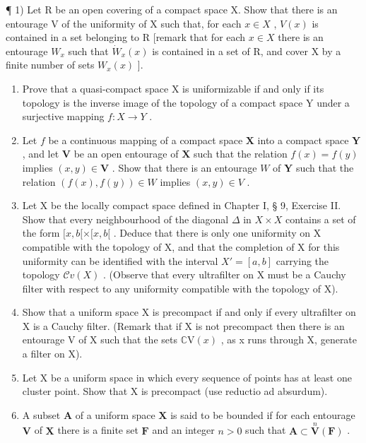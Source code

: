 \BourbakiExerciseGroup

¶ 1) Let R be an open covering of a compact space X. Show that there is an entourage V of the uniformity of X such that, for each \(x \in X\) , \(V(x)\) is contained in a set belonging to R {[}remark that for each \(x \in X\) there is an entourage \(W_x\) such that \(\dot{W}_x(x)\) is contained in a set of R, and cover X by a finite number of sets \(W_x(x)\) {]}.

\begin{enumerate}
\def\labelenumi{\arabic{enumi})}
\setcounter{enumi}{1}
\item
  Prove that a quasi-compact space X is uniformizable if and only if its topology is the inverse image of the topology of a compact space Y under a surjective mapping \(f: X \rightarrow Y\) .
\item
  Let \(f\) be a continuous mapping of a compact space \(\mathbf{X}\) into a compact space \(\mathbf{Y}\) , and let \(\mathbf{V}\) be an open entourage of \(\mathbf{X}\) such that the relation \(f(x) = f(y)\) implies \((x, y) \in \mathbf{V}\) . Show that there is an entourage \(W\) of \(\mathbf{Y}\) such that the relation \((f(x), f(y)) \in W\) implies \((x, y) \in V\) .
\item
  Let X be the locally compact space defined in Chapter I, § 9, Exercise II. Show that every neighbourhood of the diagonal \(\Delta\) in \(X \times X\) contains a set of the form \([x, b[ \times [x, b[\) . Deduce that there is only one uniformity on X compatible with the topology of X, and that the completion of X for this uniformity can be identified with the interval \(X' = [a, b]\) carrying the topology \(\mathcal{C}v(X)\) . (Observe that every ultrafilter on X must be a Cauchy filter with respect to any uniformity compatible with the topology of X).
\item
  Show that a uniform space X is precompact if and only if every ultrafilter on X is a Cauchy filter. (Remark that if X is not precompact then there is an entourage V of X such that the sets \(\mathbb{C}\mathrm{V}(x)\) , as x runs through X, generate a filter on X).
\item
  Let X be a uniform space in which every sequence of points has at least one cluster point. Show that X is precompact (use reductio ad absurdum).
\item
  A subset \(\mathbf{A}\) of a uniform space \(\mathbf{X}\) is said to be bounded if for each entourage \(\mathbf{V}\) of \(\mathbf{X}\) there is a finite set \(\mathbf{F}\) and an integer \(n > 0\) such that \(\mathbf{A} \subset \overset{n}{\mathbf{V}}(\mathbf{F})\) .
\end{enumerate}


